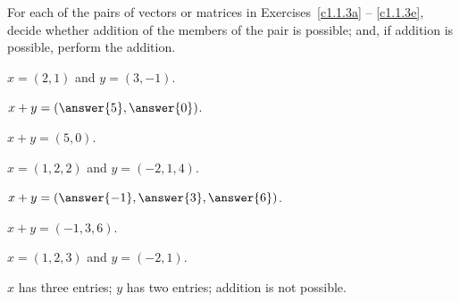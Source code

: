 \documentclass{ximera}
\begin{document}
\noindent For each of the pairs of vectors or matrices in
Exercises~\ref{c1.1.3a} -- \ref{c1.1.3e}, decide whether addition
of the members of the pair is possible; and, if addition is possible,
perform the addition.
\begin{exercise}\label{c1.1.3a}
  $x=(2,1)$ and $y=(3,-1)$.
  
  \begin{multipleChoice}
  \end{multipleChoice}
  \begin{exercise}
    $x + y = \left(\answer{5},\answer{0}\right)$.

\begin{solution}
$x + y = (5,0)$.

\end{solution}
  \end{exercise}

\begin{solution}


\end{solution}
\end{exercise}

\begin{exercise}\label{c1.1.3b}
  $x=(1,2,2)$ and $y=(-2,1,4)$.
  
  \begin{multipleChoice}
  \end{multipleChoice}
  \begin{exercise}
    $x + y = \left(\answer{-1},\answer{3},\answer{6}\right)$.

\begin{solution}
$x + y = (-1,3,6)$.

\end{solution}
  \end{exercise}

\begin{solution}


\end{solution}
\end{exercise}

\begin{exercise}\label{c1.1.3c}
  $x=(1,2,3)$ and $y=(-2,1)$.
  
  \begin{multipleChoice}
  \end{multipleChoice}  

\begin{solution}
$x$ has three entries; $y$ has two entries; addition is not possible.

\end{solution}
\end{exercise}
\end{document}
